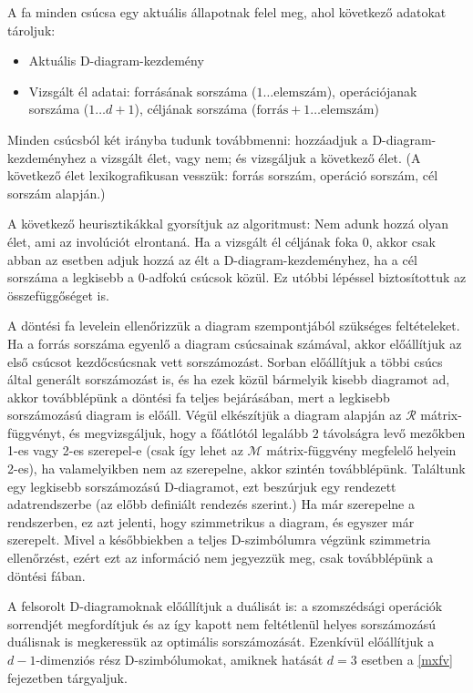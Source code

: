 \documentclass[12pt,magyar,a4paper]{article}
\begin{document}
A fa minden csúcsa egy aktuális állapotnak felel meg, ahol
következő adatokat tároljuk:
\begin{itemize}
  \item Aktuális D-diagram-kezdemény
  \item Vizsgált él adatai: forrásának sorszáma ($1\ldots\mathrm{elemszám}$),
    operációjanak sorszáma ($1\ldots d+1$), céljának sorszáma
    ($\mathrm{forrás}+1\ldots\mathrm{elemszám}$)
\end{itemize}

Minden csúcsból két irányba tudunk továbbmenni: hozzáadjuk a
D-diagram-kezdeményhez a vizsgált élet, vagy nem; és vizsgáljuk a
következő élet. (A következő élet lexikografikusan vesszük: forrás
sorszám, operáció sorszám, cél sorszám alapján.) 

A következő heurisztikákkal gyorsítjuk az algoritmust: Nem adunk hozzá olyan
élet, ami az involúciót elrontaná. Ha a vizsgált él céljának foka $0$, akkor
csak abban az esetben adjuk hozzá az élt a D-diagram-kezdeményhez, ha a cél
sorszáma a legkisebb a $0$-adfokú csúcsok közül. Ez utóbbi lépéssel
biztosítottuk az összefüggőséget is.

A döntési fa levelein ellenőrizzük a diagram szempontjából szükséges
feltételeket. Ha a forrás sorszáma egyenlő a diagram csúcsainak számával, akkor
előállítjuk az első csúcsot kezdőcsúcsnak vett sorszámozást. Sorban előállítjuk
a többi csúcs által generált sorszámozást is, és ha ezek közül bármelyik kisebb
diagramot ad, akkor továbblépünk a döntési fa teljes bejárásában, mert a
legkisebb sorszámozású diagram is előáll. Végül elkészítjük a diagram alapján az
$\mathcal{R}$ mátrix-függvényt, és megvizsgáljuk, hogy a főátlótól legalább $2$
távolságra levő mezőkben 1-es vagy 2-es szerepel-e (csak így lehet az
$\mathcal{M}$ mátrix-függvény megfelelő helyein 2-es), ha valamelyikben nem az
szerepelne, akkor szintén továbblépünk. Találtunk egy legkisebb sorszámozású
D-diagramot, ezt beszúrjuk egy rendezett adatrendszerbe (az előbb definiált
rendezés szerint.) Ha már szerepelne a rendszerben, ez azt jelenti, hogy
szimmetrikus a diagram, és egyszer már szerepelt. Mivel a későbbiekben a teljes
D-szimbólumra végzünk szimmetria ellenőrzést, ezért ezt az információ nem
jegyezzük meg, csak továbblépünk a döntési fában.

A felsorolt D-diagramoknak előállítjuk a duálisát is: a szomszédsági operációk
sorrendjét megfordítjuk és az így kapott nem feltétlenül helyes sorszámozású
duálisnak is megkeressük az optimális sorszámozását. Ezenkívül előállítjuk a
$d-1$-dimenziós rész D-szimbólumokat, amiknek hatását $d=3$ esetben a \ref{mxfv}
fejezetben tárgyaljuk.
\end{document}
